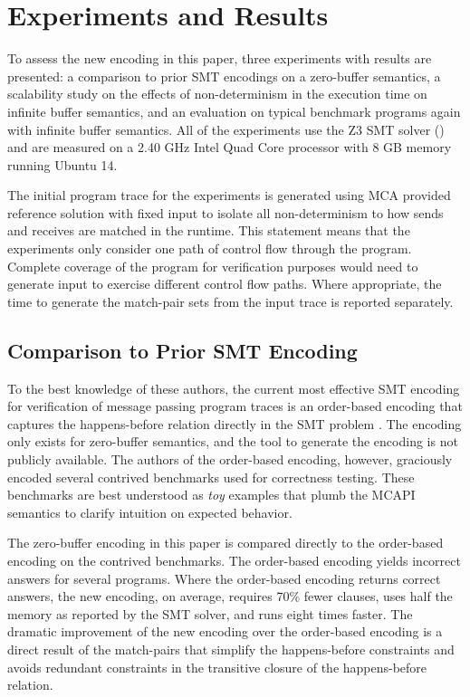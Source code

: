 \section{Experiments and Results}
To assess the new encoding in this paper, three experiments with results are presented: a comparison to prior SMT encodings on a zero-buffer semantics, a scalability study on the effects of non-determinism in the execution time on infinite buffer semantics, and an evaluation on typical benchmark programs again with infinite buffer semantics. All of the experiments use the Z3 SMT solver (\cite{demoura:tacas08}) and are measured on a 2.40 GHz Intel Quad Core processor with 8 GB memory running Ubuntu 14.

The initial program trace for the experiments is generated using MCA provided reference solution with fixed input to isolate all non-determinism to how sends and receives are matched in the runtime. This statement means that the experiments only consider one path of control flow through the program. Complete coverage of the program for verification purposes would need to generate input to exercise different control flow paths.  Where appropriate, the time to generate the match-pair sets from the input trace is reported separately. 

\subsection{Comparison to Prior SMT Encoding}
To the best knowledge of these authors, the current most effective SMT encoding for verification of message passing program traces is an order-based encoding that captures the happens-before relation directly in the SMT problem \cite{elwakil:padtad10}. The encoding only exists for zero-buffer semantics, and the tool to generate the encoding is not publicly available. The authors of the order-based encoding, however, graciously encoded several contrived benchmarks used for correctness testing. These benchmarks are best understood as \emph{toy} examples that plumb the MCAPI semantics to clarify intuition on expected behavior.

The zero-buffer encoding in this paper is compared directly to the order-based encoding on the contrived benchmarks. The order-based encoding yields incorrect answers for several programs. Where the order-based encoding returns correct answers, the new encoding, on average, requires 70\% fewer clauses, uses half the memory as reported by the SMT solver, and runs eight times faster. The dramatic improvement of the new encoding over the order-based encoding is a direct result of the match-pairs that simplify the happens-before constraints and avoids redundant constraints in the transitive closure of the happens-before relation.

